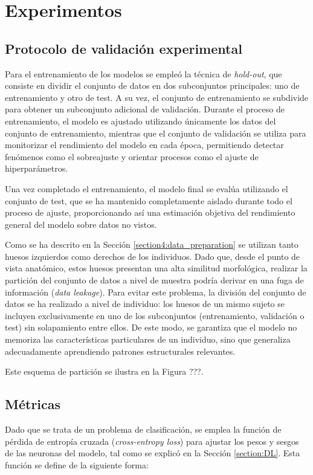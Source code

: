 \chapter{Experimentos}
\section{Protocolo de validación experimental}
Para el entrenamiento de los modelos se empleó la técnica de \textit{hold-out}, que consiste en dividir el conjunto de datos en dos subconjuntos principales: uno de entrenamiento y otro de test. A su vez, el conjunto de entrenamiento se subdivide para obtener un subconjunto adicional de validación. Durante el proceso de entrenamiento, el modelo es ajustado utilizando únicamente los datos del conjunto de entrenamiento, mientras que el conjunto de validación se utiliza para monitorizar el rendimiento del modelo en cada época, permitiendo detectar fenómenos como el sobreajuste y orientar procesos como el ajuste de hiperparámetros.

Una vez completado el entrenamiento, el modelo final se evalúa utilizando el conjunto de test, que se ha mantenido completamente aislado durante todo el proceso de ajuste, proporcionando así una estimación objetiva del rendimiento general del modelo sobre datos no vistos.

Como se ha descrito en la Sección \ref{section4:data_preparation} se utilizan tanto huesos izquierdos como derechos de los individuos. Dado que, desde el punto de vista anatómico, estos huesos presentan una alta similitud morfológica, realizar la partición del conjunto de datos a nivel de muestra podría derivar en una fuga de información (\textit{data leakage}). Para evitar este problema, la división del conjunto de datos se ha realizado a nivel de individuo: los huesos de un mismo sujeto se incluyen exclusivamente en uno de los subconjuntos (entrenamiento, validación o test) sin solapamiento entre ellos. De este modo, se garantiza que el modelo no memoriza las características particulares de un individuo, sino que generaliza adecuadamente aprendiendo patrones estructurales relevantes.

Este esquema de partición se ilustra en la Figura ???.
\section{Métricas}
\label{section5:metrics}
Dado que se trata de un problema de clasificación, se emplea la función de pérdida de entropía cruzada (\textit{cross-entropy loss}) para ajustar los pesos y sesgos de las neuronas del modelo, tal como se explicó en la Sección \ref{section:DL}. Esta función se define de la siguiente forma:

